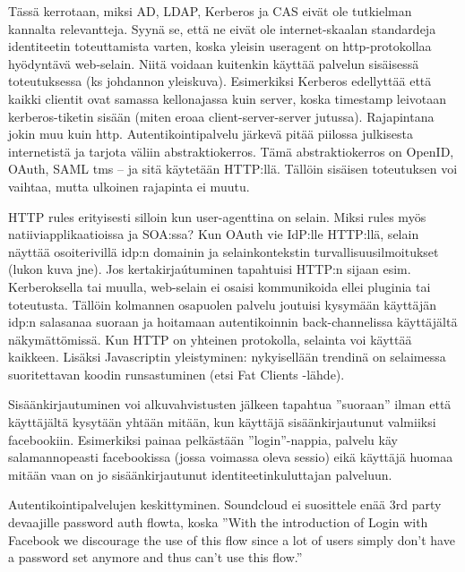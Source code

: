 \documentclass[finnish,gradu]{tktltiki}
\begin{document}
  Tässä kerrotaan, miksi AD, LDAP, Kerberos ja CAS eivät ole tutkielman kannalta relevantteja. Syynä se, että ne eivät ole internet-skaalan standardeja identiteetin toteuttamista varten, koska yleisin useragent on http-protokollaa hyödyntävä web-selain. Niitä voidaan kuitenkin käyttää palvelun sisäisessä toteutuksessa (ks johdannon yleiskuva). Esimerkiksi Kerberos edellyttää että kaikki clientit ovat samassa kellonajassa kuin server, koska timestamp leivotaan kerberos-tiketin sisään (miten eroaa client-server-server jutussa). Rajapintana jokin muu kuin http. Autentikointipalvelu järkevä pitää piilossa julkisesta internetistä ja tarjota väliin abstraktiokerros. Tämä abstraktiokerros on OpenID, OAuth, SAML tms -- ja sitä käytetään HTTP:llä. Tällöin sisäisen toteutuksen voi vaihtaa, mutta ulkoinen rajapinta ei muutu.

  HTTP rules erityisesti silloin kun user-agenttina on selain. Miksi rules myös natiiviapplikaatioissa ja SOA:ssa?
  Kun OAuth vie IdP:lle HTTP:llä, selain näyttää osoiterivillä idp:n domainin ja selainkontekstin turvallisuusilmoitukset (lukon kuva jne). Jos kertakirjaútuminen tapahtuisi HTTP:n sijaan esim. Kerberoksella tai muulla, web-selain ei osaisi kommunikoida ellei pluginia tai toteutusta. Tällöin kolmannen osapuolen palvelu joutuisi kysymään käyttäjän idp:n salasanaa suoraan ja hoitamaan autentikoinnin back-channelissa käyttäjältä näkymättömissä.
  Kun HTTP on yhteinen protokolla, selainta voi käyttää kaikkeen. Lisäksi Javascriptin yleistyminen: nykyisellään trendinä on selaimessa suoritettavan koodin runsastuminen (etsi Fat Clients -lähde).

  Sisäänkirjautuminen voi alkuvahvistusten jälkeen tapahtua ''suoraan'' ilman että käyttäjältä kysytään yhtään mitään, kun käyttäjä sisäänkirjautunut valmiiksi facebookiin. Esimerkiksi painaa pelkästään ''login''-nappia, palvelu käy salamannopeasti facebookissa (jossa voimassa oleva sessio) eikä käyttäjä huomaa mitään vaan on jo sisäänkirjautunut identiteetinkuluttajan palveluun.

  Autentikointipalvelujen keskittyminen. Soundcloud ei suosittele enää 3rd party devaajille password auth flowta, koska ''With the introduction of Login with Facebook we discourage the use of this flow since a lot of users simply don't have a password set anymore and thus can't use this flow.''
\end{document}
